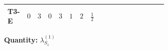 \documentclass[8pt]{article}
\begin{document}
\begin{landscape}
\begin{longtable}{@{}llcccccc >{\raggedright\arraybackslash}p{0.21\linewidth} >{\raggedright\arraybackslash}p{0.21\linewidth} >{\raggedright\arraybackslash}p{0.21\linewidth}@{}}
T3-E & $0$ & $3$ & $0$ & $3$ & $1$ & $2$ & $\frac{1}{2}$ & \scriptsize\adjustbox{max width=\linewidth}{$\begin{gathered} {\lambda_{S_1}^{(1)}} (4 T_{\nu}^{(1)}+14 {\lambda_{S_1}^{(A)}})\end{gathered}$} & \scriptsize\adjustbox{max width=\linewidth}{$\begin{gathered} +2 {\lambda_{S_1}^{(A)}} T_{\nu}^{(1)}\end{gathered}$} & \scriptsize\adjustbox{max width=\linewidth}{$\begin{gathered} +21 {g_2}^4\end{gathered}$} \\
\midrule
\bottomrule
\end{longtable}
\clearpage
\noindent\textbf{Quantity: }$\lambda_{S_1}^{(1)}$\par\smallskip

\end{landscape}
\end{document}
